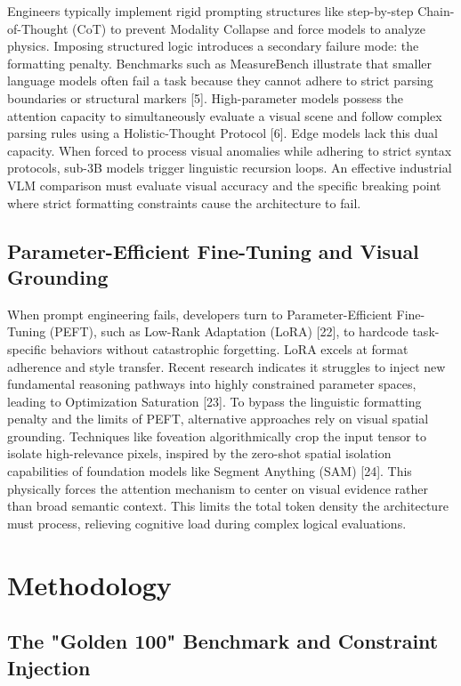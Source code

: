 \documentclass{article}
\begin{document}
Engineers typically implement rigid prompting structures like step-by-step Chain-of-Thought (CoT) to prevent Modality Collapse and force models to analyze physics. Imposing structured logic introduces a secondary failure mode: the formatting penalty. Benchmarks such as MeasureBench illustrate that smaller language models often fail a task because they cannot adhere to strict parsing boundaries or structural markers [5]. High-parameter models possess the attention capacity to simultaneously evaluate a visual scene and follow complex parsing rules using a Holistic-Thought Protocol [6]. Edge models lack this dual capacity. When forced to process visual anomalies while adhering to strict syntax protocols, sub-3B models trigger linguistic recursion loops. An effective industrial VLM comparison must evaluate visual accuracy and the specific breaking point where strict formatting constraints cause the architecture to fail.

\subsection*{Parameter-Efficient Fine-Tuning and Visual Grounding}

When prompt engineering fails, developers turn to Parameter-Efficient Fine-Tuning (PEFT), such as Low-Rank Adaptation (LoRA) [22], to hardcode task-specific behaviors without catastrophic forgetting. LoRA excels at format adherence and style transfer. Recent research indicates it struggles to inject new fundamental reasoning pathways into highly constrained parameter spaces, leading to Optimization Saturation [23]. To bypass the linguistic formatting penalty and the limits of PEFT, alternative approaches rely on visual spatial grounding. Techniques like foveation algorithmically crop the input tensor to isolate high-relevance pixels, inspired by the zero-shot spatial isolation capabilities of foundation models like Segment Anything (SAM) [24]. This physically forces the attention mechanism to center on visual evidence rather than broad semantic context. This limits the total token density the architecture must process, relieving cognitive load during complex logical evaluations.


\section*{Methodology}


\subsection*{The "Golden 100" Benchmark and Constraint Injection}
\end{document}
